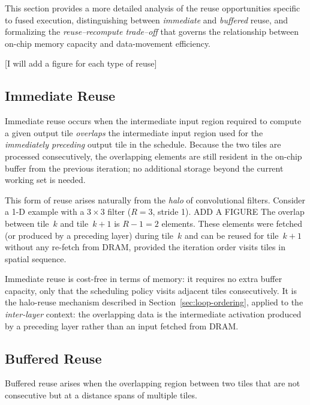 This section provides a more detailed analysis of the reuse
opportunities specific to fused execution, distinguishing between
\emph{immediate} and \emph{buffered} reuse, and formalizing the
\emph{reuse--recompute trade--off} that governs the relationship
between on-chip memory capacity and data-movement efficiency.

[I will add a figure for each type of reuse]
\subsection{Immediate Reuse}
\label{sec:fds-immediate-reuse}

Immediate reuse occurs when the intermediate input region required
to compute a given output tile \emph{overlaps} the intermediate input
region used for the \emph{immediately preceding} output tile in the
schedule.
Because the two tiles are processed consecutively, the overlapping
elements are still resident in the on-chip buffer from the previous
iteration; no additional storage beyond the current working set is
needed.

This form of reuse arises naturally from the \emph{halo} of
convolutional filters.
Consider a 1-D example with a $3\times 3$ filter ($R = 3$, stride 1). ADD A FIGURE 
The overlap between tile~$k$ and tile~$k+1$ is $R - 1 = 2$ elements.
These elements were fetched (or produced by a preceding layer)
during tile~$k$ and can be reused for tile~$k+1$ without any
re-fetch from DRAM, provided the iteration order visits tiles in spatial
sequence.

Immediate reuse is cost-free in terms of memory: it requires no
extra buffer capacity, only that the scheduling policy visits
adjacent tiles consecutively.
It is the halo-reuse mechanism described in
Section~\ref{sec:loop-ordering}, applied to the \emph{inter-layer}
context: the overlapping data is the intermediate activation produced
by a preceding layer rather than an input fetched from DRAM.


\subsection{Buffered Reuse}
\label{sec:fds-buffered-reuse}

Buffered reuse arises when the overlapping region between two tiles that are not consecutive but at
a distance spans of multiple tiles.

